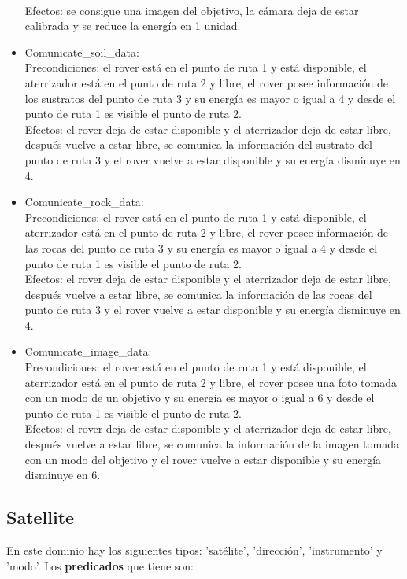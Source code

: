 \documentclass{uc3mpracticas}
\begin{document}
\begin{itemize}
    \\Efectos: se consigue una imagen del objetivo, la cámara deja de estar calibrada y se reduce la energía en 1 unidad.
    \item Comunicate\_soil\_data:
    \\Precondiciones: el rover está en el punto de ruta 1 y está disponible, el aterrizador está en el punto de ruta 2 y libre, el rover posee información de los sustratos del punto de ruta 3 y su energía es mayor o igual a 4 y desde el punto de ruta 1 es visible el punto de ruta 2.
    \\Efectos: el rover deja de estar disponible y el aterrizador deja de estar libre, después vuelve a estar libre, se comunica la información del sustrato del punto de ruta 3 y el rover vuelve a estar disponible y su energía disminuye en 4.
    \item Comunicate\_rock\_data:
    \\Precondiciones: el rover está en el punto de ruta 1 y está disponible, el aterrizador está en el punto de ruta 2 y libre, el rover posee información de las rocas del punto de ruta 3 y su energía es mayor o igual a 4 y desde el punto de ruta 1 es visible el punto de ruta 2.
    \\Efectos: el rover deja de estar disponible y el aterrizador deja de estar libre, después vuelve a estar libre, se comunica la información de las rocas del punto de ruta 3 y el rover vuelve a estar disponible y su energía disminuye en 4.
    \item Comunicate\_image\_data:
    \\Precondiciones: el rover está en el punto de ruta 1 y está disponible, el aterrizador está en el punto de ruta 2 y libre, el rover posee una foto tomada con un modo de un objetivo y su energía es mayor o igual a 6 y desde el punto de ruta 1 es visible el punto de ruta 2.
    \\Efectos: el rover deja de estar disponible y el aterrizador deja de estar libre, después vuelve a estar libre, se comunica la información de la imagen tomada con un modo del objetivo y el rover vuelve a estar disponible y su energía disminuye en 6.
  \end{itemize}




  \subsection{Satellite}

  En este dominio hay los siguientes tipos: 'satélite', 'dirección', 'instrumento' y 'modo'. Los \textbf{predicados} que tiene son:
\end{document}
